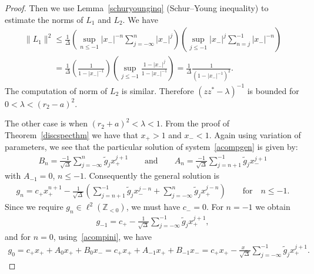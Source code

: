 \begin{proof}
Then we use Lemma~\ref{schuryounginq} (Schur--Young inequality) to estimate the norms of $L_1$ and $L_2$.
We have
\begin{gather*}
\|L_1\|^2
\le \frac{1}{\Delta}\left(\underset{n\le-1}{\sup}|x_-|^{-n}\sum\limits_{j=-\infty}^n|x_-|^j\right)
\left(\underset{j\le-1}{\sup}|x_-|^j\sum\limits_{n=j}^{-1}|x_-|^{-n}\right)
\\
\phantom{\|L_1\|^2}{}
 =\frac{1}{\Delta}\left(\frac{1}{1-|x_-|^{-1}}\right)\left(\underset{j\le-1}{\sup}\frac{1-|x_-|^{j}}{1-|x_-|^{-1}}\right)
 =\frac{1}{\Delta}\frac{1}{(1-|x_-|^{-1})^2}.
\end{gather*}
The computation of norm of $L_2$ is similar.
Therefore $(zz^*-\lambda)^{-1}$ is bounded for $0<\lambda<(r_2-a)^2$.

The other case is when $(r_2+a)^2<\lambda<1$.
From the proof of Theorem~\ref{discspecthm} we have that $x_+>1$ and $x_-<1$.
Again using variation of parameters, we see that the particular solution of system~\eqref{acompgen} is given by:
\begin{gather*}
B_n=\frac{-1}{\sqrt{\Delta}}\sum\limits_{j=-\infty}^n\tilde{g}_jx_+^{j+1}
\qquad
\text{and}
\qquad
A_n=\frac{-1}{\sqrt{\Delta}}\sum\limits_{j=n+1}^{-1}\tilde{g}_jx_-^{j+1}
\end{gather*}
with $A_{-1}=0$, $n\leq -1$.
Consequently the general solution is
\begin{gather*}
g_n=c_+x_+^{n+1} -\frac{1}{\sqrt{\Delta}}\left(\sum\limits_{j=n+1}^{-1}\tilde{g}_jx_-^{j-n}+\sum\limits_{j=-\infty}^n\tilde{g}_jx_+^{j-n}\right)
\qquad
\text{for}
\quad
n\leq-1.
\end{gather*}
Since we require $g_n\in\ell^2({\mathbb Z}_{<0})$, we must have $c_-=0$.
For $n=-1$ we obtain
\begin{gather*}
g_{-1}=c_+-\frac{1}{\sqrt{\Delta}}\sum\limits_{j=-\infty}^{-1}\tilde{g}_jx_+^{j+1},
\end{gather*}
and for $n=0$, using~\eqref{acompini}, we have
\begin{gather*}
g_{0}=c_+ x_++A_0x_++B_0x_-= c_+ x_++A_{-1}x_++B_{-1}x_-=c_+ x_+-\frac{x_-}{\sqrt{\Delta}}\sum\limits_{j=-\infty}^{-1}\tilde{g}_jx_+^{j+1}.
\end{gather*}


\end{proof}
